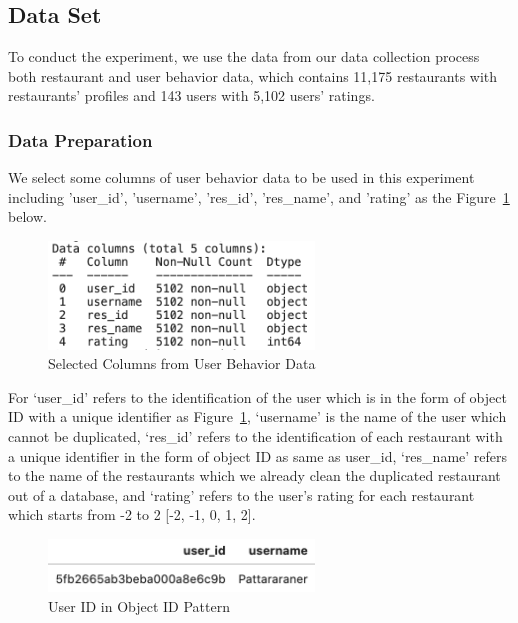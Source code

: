 \documentclass[12pt,oneside,openright,a4paper]{cpe-english-project}
\begin{document}
\subsection{Data Set}

To conduct the experiment, we use the data from our data collection process both restaurant and user behavior data, which contains 11,175 restaurants with restaurants’ profiles and 143 users with 5,102 users’ ratings.

\subsubsection{Data Preparation}

We select some columns of user behavior data to be used in this experiment including 'user\_id', 'username', 'res\_id', 'res\_name', and 'rating' as the Figure~\ref{fig:4SelectedColumnsfromUserBehaviorData} below.

\begin{figure}[H]\centering
\includegraphics[width=200pt]{./images/4SelectedColumnsfromUserBehaviorData.png}
\caption{Selected Columns from User Behavior Data}\label{fig:4SelectedColumnsfromUserBehaviorData}
\end{figure}\vspace{-24pt}

For ‘user\_id’ refers to the identification of the user which is in the form of object ID with a unique identifier as Figure~\ref{fig:4SelectedColumnsfromUserBehaviorData}, ‘username’ is the name of the user which cannot be duplicated, ‘res\_id’ refers to the identification of each restaurant with a unique identifier in the form of object ID as same as user\_id, ‘res\_name’ refers to the name of the restaurants which we already clean the duplicated restaurant out of a database, and ‘rating’ refers to the user’s rating for each restaurant which starts from -2 to 2 [-2, -1, 0, 1, 2].

\begin{figure}[H]\centering
\includegraphics[width=200pt]{./images/4UserIDinObjectIDPattern.png}
\caption{User ID in Object ID Pattern}\label{fig:4UserIDinObjectIDPattern}
\end{figure}\vspace{-24pt}
\end{document}
